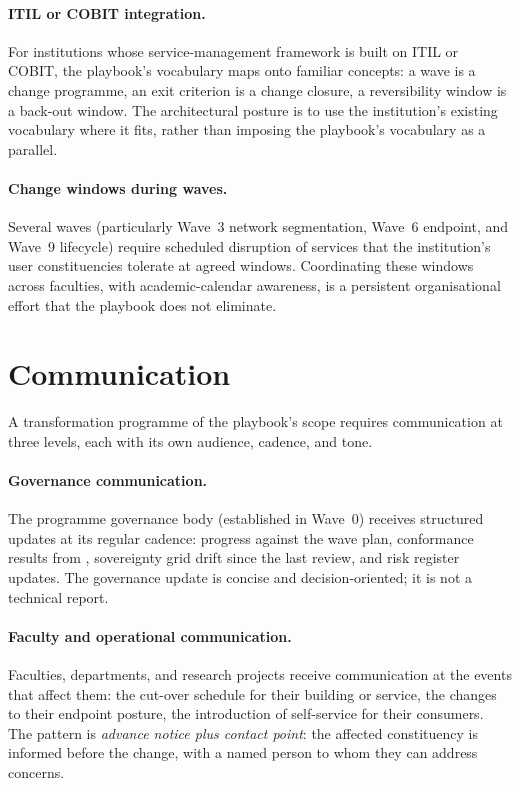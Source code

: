 \paragraph{ITIL or COBIT integration.} For institutions whose
service-management framework is built on ITIL or COBIT, the
playbook's vocabulary maps onto familiar concepts: a wave is a
change programme, an exit criterion is a change closure, a
reversibility window is a back-out window. The architectural
posture is to use the institution's existing vocabulary where it
fits, rather than imposing the playbook's vocabulary as a
parallel.

\paragraph{Change windows during waves.} Several waves
(particularly Wave~3 network segmentation, Wave~6 endpoint, and
Wave~9 lifecycle) require scheduled disruption of services that
the institution's user constituencies tolerate at agreed
windows. Coordinating these windows across faculties, with
academic-calendar awareness, is a persistent organisational
effort that the playbook does not eliminate.

\section{Communication}
\label{sec:cc-communication}

A transformation programme of the playbook's scope requires
communication at three levels, each with its own audience,
cadence, and tone.

\paragraph{Governance communication.} The programme governance
body (established in Wave~0) receives structured updates at its
regular cadence: progress against the wave plan, conformance
results from , sovereignty grid drift
since the last review, and risk register updates. The governance
update is concise and decision-oriented; it is not a technical
report.

\paragraph{Faculty and operational communication.} Faculties,
departments, and research projects receive communication at the
events that affect them: the cut-over schedule for their building
or service, the changes to their endpoint posture, the
introduction of self-service for their consumers. The pattern is
\emph{advance notice plus contact point}: the affected
constituency is informed before the change, with a named person
to whom they can address concerns.

